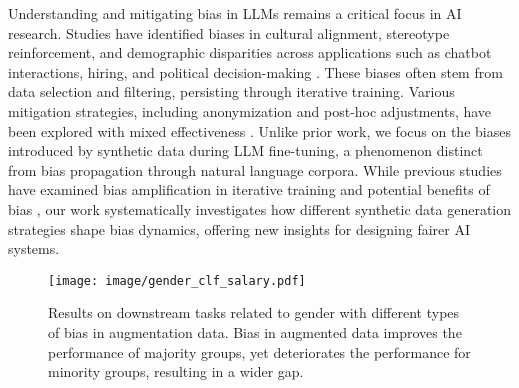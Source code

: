 Understanding and mitigating bias in LLMs remains a critical focus in AI research. Studies have identified biases in cultural alignment, stereotype reinforcement, and demographic disparities across applications such as chatbot interactions, hiring, and political decision-making \citep{tao2024cultural, bai2024measuring, eloundou2024first, guo2024hey, kotek2023gender, Fang2023BiasOA, nghiem-etal-2024-gotta, hu2024generative, fisher2024biased, beatty2024revealing}. These biases often stem from data selection and filtering, persisting through iterative training\citep{navigli2023biases, naous-etal-2024-beer, lyu2023pathway, seshadri2024bias, zhang2024will,gallegos2024bias}. Various mitigation strategies, including anonymization and post-hoc adjustments, have been explored with mixed effectiveness \citep{giorgi2024explicit, Liang2021TowardsUA, beatty2024revealing}. Unlike prior work, we focus on the biases introduced by synthetic data during LLM fine-tuning, a phenomenon distinct from bias propagation through natural language corpora. While previous studies have examined bias amplification in iterative training \citep{wang2024bias, zhang2024will} and potential benefits of bias \cite{chen2024understanding,chen2024slight}, our work systematically investigates how different synthetic data generation strategies shape bias dynamics, offering new insights for designing fairer AI systems.

\begin{figure*}[t!]
  \centering
  \texttt{[image: image/gender\_clf\_salary.pdf]}
  \vspace{-.25in}
  \caption{Results on downstream tasks related to gender with different types of bias in augmentation data. 
  Bias in augmented data improves the performance of majority groups, yet deteriorates the performance for minority groups, resulting in a wider gap.
  }
  \label{fig:gender_clf_salary}
\vspace{-.1in}
\end{figure*}